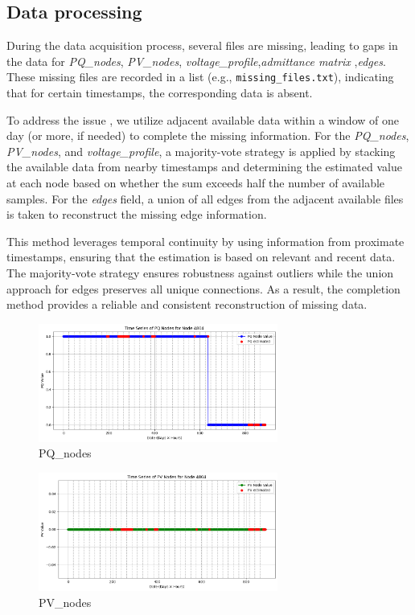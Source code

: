 \documentclass[12pt]{article}
\begin{document}
\subsection*{Data processing}
During the data acquisition process, several files are missing, leading to gaps in the data for \emph{PQ\_nodes}, \emph{PV\_nodes}, \emph{voltage\_profile},\emph{admittance matrix} ,\emph{edges}. These missing files are recorded in a list (e.g., \texttt{missing\_files.txt}), indicating that for certain timestamps, the corresponding data is absent.

To address the issue , we utilize adjacent available data within a window of one day (or more, if needed) to complete the missing information. For the \emph{PQ\_nodes}, \emph{PV\_nodes}, and \emph{voltage\_profile}, a majority-vote strategy is applied by stacking the available data from nearby timestamps and determining the estimated value at each node based on whether the sum exceeds half the number of available samples. For the \emph{edges} field, a union of all edges from the adjacent available files is taken to reconstruct the missing edge information.

This method leverages temporal continuity by using information from proximate timestamps, ensuring that the estimation is based on relevant and recent data. The majority-vote strategy ensures robustness against outliers while the union approach for edges preserves all unique connections. As a result, the completion method provides a reliable and consistent reconstruction of missing data.

\begin{figure}[H]
    \centering
    \includegraphics[width=0.7\textwidth]{picture/PQ_nodes.png}
    \caption{PQ\_nodes}
    \label{fig:PQ_nodes}
\end{figure}

\begin{figure}[H]
    \centering
    \includegraphics[width=0.7\textwidth]{picture/PV_nodes.png}
    \caption{PV\_nodes}
    \label{fig:PV_nodes}
\end{figure}
\end{document}
